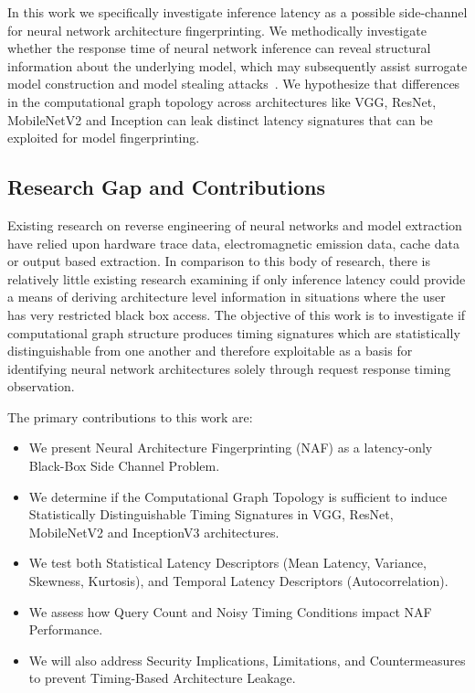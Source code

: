 \documentclass[conference]{IEEEtran}
\begin{document}
 In this work we specifically investigate inference latency as a possible side-channel for neural network architecture fingerprinting. We methodically investigate whether the response time of neural network inference can reveal structural information about the underlying model, which may subsequently assist surrogate model construction and model stealing attacks~\cite{knockoff,prada}. We hypothesize that differences in the computational graph topology across architectures like VGG, ResNet, MobileNetV2 and Inception can leak distinct latency signatures that can be exploited for model fingerprinting.


\subsection{Research Gap and Contributions}

Existing research on reverse engineering of neural networks and model extraction have relied upon hardware trace data, electromagnetic emission data, cache data or output based extraction. In comparison to this body of research, there is relatively little existing research examining if only inference latency could provide a means of deriving architecture level information in situations where the user has very restricted black box access. The objective of this work is to investigate if computational graph structure produces timing signatures which are statistically distinguishable from one another and therefore exploitable as a basis for identifying neural network architectures solely through request response timing observation.

The primary contributions to this work are:
\begin{itemize}
\item We present Neural Architecture Fingerprinting (NAF) as a latency-only Black-Box Side Channel Problem.
\item We determine if the Computational Graph Topology is sufficient to induce Statistically Distinguishable Timing Signatures in VGG, ResNet, MobileNetV2 and InceptionV3 architectures.
\item We test both Statistical Latency Descriptors (Mean Latency, Variance, Skewness, Kurtosis), and Temporal Latency Descriptors (Autocorrelation).
\item We assess how Query Count and Noisy Timing Conditions impact NAF Performance.
\item We will also address Security Implications, Limitations, and Countermeasures to prevent Timing-Based Architecture Leakage.
\end{itemize}
\end{document}
